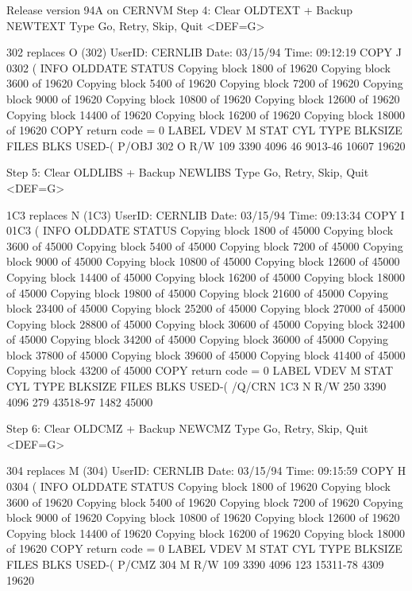 \begin{XMPt}{Release version 94A on CERNVM}
 Step 4: Clear OLDTEXT + Backup NEWTEXT
 Type Go, Retry, Skip, Quit <DEF=G>
 
 302 replaces O (302)
 UserID: CERNLIB   Date: 03/15/94  Time: 09:12:19
 COPY     J        0302     (        INFO     OLDDATE  STATUS
 Copying block    1800 of   19620
 Copying block    3600 of   19620
 Copying block    5400 of   19620
 Copying block    7200 of   19620
 Copying block    9000 of   19620
 Copying block   10800 of   19620
 Copying block   12600 of   19620
 Copying block   14400 of   19620
 Copying block   16200 of   19620
 Copying block   18000 of   19620
 COPY     return code =   0
 LABEL  VDEV M  STAT  CYL TYPE BLKSIZE  FILES  BLKS USED-(%
 P/OBJ  302  O   R/W  109 3390 4096        46       9013-46      10607      19620
 
 Step 5: Clear OLDLIBS + Backup NEWLIBS
 Type Go, Retry, Skip, Quit <DEF=G>
 
 1C3 replaces N (1C3)
 UserID: CERNLIB   Date: 03/15/94  Time: 09:13:34
 COPY     I        01C3     (        INFO     OLDDATE  STATUS
 Copying block    1800 of   45000
 Copying block    3600 of   45000
 Copying block    5400 of   45000
 Copying block    7200 of   45000
 Copying block    9000 of   45000
 Copying block   10800 of   45000
 Copying block   12600 of   45000
 Copying block   14400 of   45000
 Copying block   16200 of   45000
 Copying block   18000 of   45000
 Copying block   19800 of   45000
 Copying block   21600 of   45000
 Copying block   23400 of   45000
 Copying block   25200 of   45000
 Copying block   27000 of   45000
 Copying block   28800 of   45000
 Copying block   30600 of   45000
 Copying block   32400 of   45000
 Copying block   34200 of   45000
 Copying block   36000 of   45000
 Copying block   37800 of   45000
 Copying block   39600 of   45000
 Copying block   41400 of   45000
 Copying block   43200 of   45000
 COPY     return code =   0
 LABEL  VDEV M  STAT  CYL TYPE BLKSIZE  FILES  BLKS USED-(%
 /Q/CRN 1C3  N   R/W  250 3390 4096       279      43518-97       1482      45000
 
 Step 6: Clear OLDCMZ + Backup NEWCMZ
 Type Go, Retry, Skip, Quit <DEF=G>
 
 304 replaces M (304)
 UserID: CERNLIB   Date: 03/15/94  Time: 09:15:59
 COPY     H        0304     (        INFO     OLDDATE  STATUS
 Copying block    1800 of   19620
 Copying block    3600 of   19620
 Copying block    5400 of   19620
 Copying block    7200 of   19620
 Copying block    9000 of   19620
 Copying block   10800 of   19620
 Copying block   12600 of   19620
 Copying block   14400 of   19620
 Copying block   16200 of   19620
 Copying block   18000 of   19620
 COPY     return code =   0
 LABEL  VDEV M  STAT  CYL TYPE BLKSIZE  FILES  BLKS USED-(%
 P/CMZ  304  M   R/W  109 3390 4096       123      15311-78       4309      19620
 

\end{XMPt}
